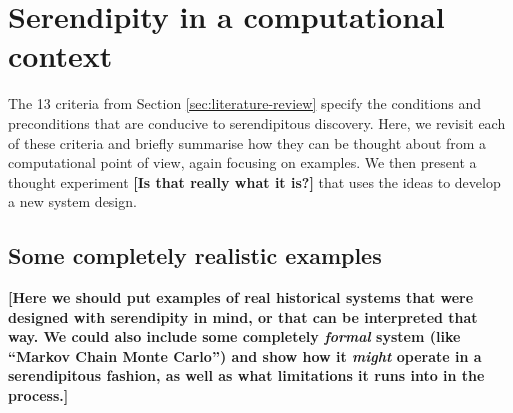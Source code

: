 \section{Serendipity in a computational context} \label{sec:computational-serendipity}

The 13 criteria from Section \ref{sec:literature-review} specify the
conditions and preconditions that are conducive to serendipitous
discovery.  Here, we revisit each of these criteria and briefly
summarise how they can be thought about from a computational point of
view, again focusing on examples.  We then present a thought
experiment \textbf{[Is that really what it is?]} that uses the ideas
to develop a new system design.

% 

\subsection{Some completely realistic examples}

\textbf{[Here we should put examples of real historical systems that
    were designed with serendipity in mind, or that can be interpreted
    that way.  We could also include some completely \emph{formal}
    system (like ``Markov Chain Monte Carlo'') and show how it
    \emph{might} operate in a serendipitous fashion, as well as what
    limitations it runs into in the process.]}
